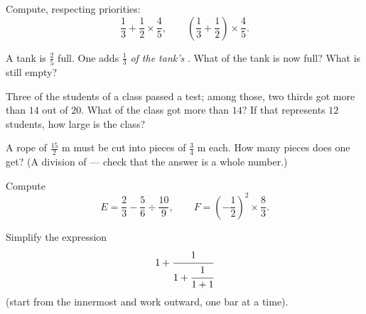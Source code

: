 \begin{exercise}[$\star$]\label{exo:g8:fractions:7}
Compute, respecting priorities:
\[
\frac{1}{3} + \frac{1}{2} \times \frac{4}{5},
\qquad
\left(\frac{1}{3} + \frac{1}{2}\right) \times \frac{4}{5} .
\]
\end{exercise}

\begin{exercise}[$\star\star$]\label{exo:g8:fractions:8}
A tank is $\frac{2}{5}$ full. One adds $\frac{1}{3}$ \emph{of the
tank's }. What  of the tank is now full? What
 is still empty?
\end{exercise}

\begin{exercise}[$\star\star$]\label{exo:g8:fractions:9}
Three  of the students of a class passed a test; among those,
two thirds got more than $14$ out of $20$. What  of the class
got more than $14$? If that represents $12$ students, how large is
the class?
\end{exercise}

\begin{exercise}[$\star\star$]\label{exo:g8:fractions:10}
A rope of $\frac{15}{2}$ m must be cut into pieces of $\frac{3}{4}$ m
each. How many pieces does one get? (A division of  ---
check that the answer is a whole number.)
\end{exercise}

\begin{exercise}[$\star\star$]\label{exo:g8:fractions:11}
Compute
\[
E = \frac{2}{3} - \frac{5}{6} \div \frac{10}{9},
\qquad
F = \left(-\frac{1}{2}\right)^2 \times \frac{8}{3} .
\]
\end{exercise}

\begin{exercise}[$\star\star\star$]\label{exo:g8:fractions:12}
Simplify the expression
\[
1 + \cfrac{1}{1 + \cfrac{1}{1 + 1}}
\]
(start from the innermost  and work outward, one bar at a
time).
\end{exercise}
